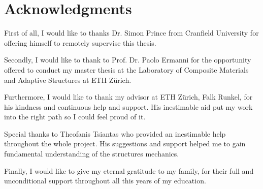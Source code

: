 \section*{Acknowledgments}
First of all, I would like to thanks Dr. Simon Prince from Cranfield University for offering himself to remotely supervise this thesis.

\noindent
Secondly, I would like to thank to Prof. Dr. Paolo Ermanni for the opportunity offered to conduct my master thesis at the Laboratory of Composite Materials and Adaptive Structures at ETH Z\"urich.

\noindent
Furthermore, I would like to thank my advisor at ETH Z\"urich, Falk Runkel, for his kindness and continuous help and support. His inestimable aid put my work into the right path so I could feel proud of it.

\noindent
Special thanks to Theofanis Tsiantas who provided an inestimable help throughout the whole project. His suggestions and support helped me to gain fundamental understanding of the structures mechanics. 

\noindent
Finally, I would like to give my eternal gratitude to my family, for their full and unconditional support throughout all this years of my education.